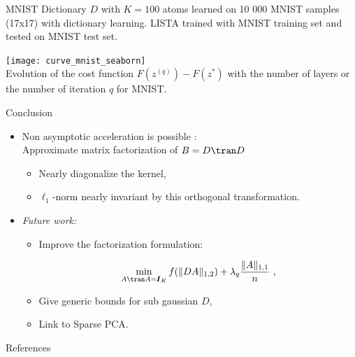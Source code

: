 \documentclass[ignorenonframetext]{beamer}
\begin{document}
\begin{frame}{MNIST}
	Dictionary $D$ with $K=100$ atoms learned on 10 000 MNIST samples (17x17) with dictionary learning.
	LISTA trained with MNIST training set and tested on MNIST test set.

    \centering
    \texttt{[image: curve\_mnist\_seaborn]}\\
     Evolution of the cost function $F(z^{(q)})-F(z^*)$ with the number of layers or the number of iteration $q$ for MNIST.
\end{frame}

\begin{frame}{Conclusion}
\begin{itemize}\itemsep1.5em
	\item Non asymptotic acceleration is possible :\\
	Approximate matrix factorization of $B=D\tran D$
	\begin{itemize}
	    \item Nearly diagonalize the kernel,
	    \item $\ell_1$-norm nearly invariant by this orthogonal transformation.
    \end{itemize}

    \item \emph{Future work:}
    \begin{itemize}
	    \item Improve the factorization formulation:
	    
	    \[ 
	    	\min_{A\tran A= \pmb I_K} f(\|DA\|_{1, 2}) + \lambda_q\frac{\|A\|_{1,1}}{n}~,
	    \]
	    \item Give generic bounds for sub gaussian $D$,
	    \item Link to Sparse PCA.
    \end{itemize}
\end{itemize}
	
\end{frame}





{
\begin{frame}{References}
	\tiny 
\end{frame}
}
\end{document}
